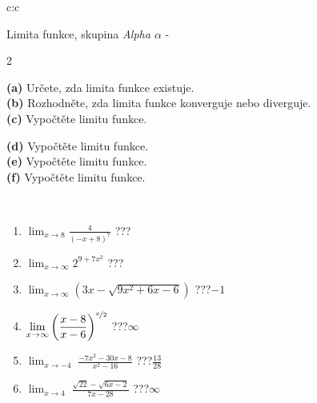 \documentclass[10pt]{report}
\begin{document}
\thispagestyle{empty}
\begin{tabular}{c:c}
\begin{minipage}[c][104.5mm][t]{0.5\linewidth}
\begin{center}
\vspace{7mm}
{\huge Limita funkce, skupina \textit{Alpha $\alpha$} -}\\[5mm]
\begin{minipage}{0.95\linewidth}
\begin{center}
{\small \begin{multicols}{2} \raggedright
\textbf{(a)} Určete, zda limita funkce existuje. \\[1mm]
\textbf{(b)} Rozhodněte, zda limita funkce konverguje nebo diverguje. \\[1mm]
\textbf{(c)} Vypočtěte limitu funkce. \par \columnbreak
\textbf{(d)} Vypočtěte limitu funkce. \\[1mm]
\textbf{(e)} Vypočtěte limitu funkce. \\[1mm]
\textbf{(f)} Vypočtěte limitu funkce. \\[1mm]
\end{multicols}
}
\end{center}
\end{minipage}
\\[4mm]
\begin{minipage}{0.79\linewidth}
\begin{center}
\begin{varwidth}{\linewidth}
\begin{enumerate}
\normalsize
\item $\displaystyle\lim_{x\to8}{\frac{4}{(-x+8)^{7}}}$\quad \dotfill\; ???\;\dotfill \quad {}
\item $\displaystyle\lim_{x\to\infty}{2^{9+7x^2}}$\quad \dotfill\; ???\;\dotfill \quad {}
\item $\displaystyle\lim_{x\to\infty}{\left(3x - \sqrt{9x^2+6x-6}\right)}$\quad \dotfill\; ???\;\dotfill \quad $-1$
\item $\displaystyle\lim_{x\to\infty}{\left( \frac{x-8}{x-6} \right)^{\nicefrac{x}{2}}}$\quad \dotfill\; ???\;\dotfill \quad $\infty$
\item $\displaystyle\lim_{x\to -4}{\;\frac{-7x^2-30x-8}{x^2-16}}$\quad \dotfill\; ???\;\dotfill \quad $\frac{13}{28}$
\item $\displaystyle\lim_{x\to 4}{\;\frac{\sqrt{22}-\sqrt{6x-2}}{7x-28}}$\quad \dotfill\; ???\;\dotfill \quad $\infty$
\end{enumerate}

\end{varwidth}
\end{center}
\end{minipage}
\end{center}
\end{minipage}
\end{tabular}
\end{document}
